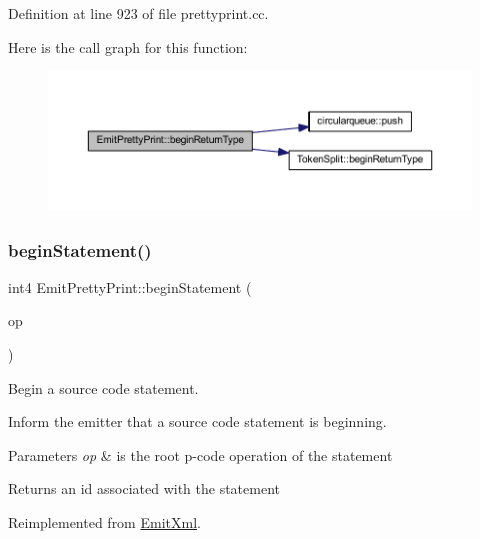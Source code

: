 Definition at line 923 of file prettyprint.\+cc.

Here is the call graph for this function\+:
\nopagebreak
\begin{figure}[H]
\begin{center}
\leavevmode
\includegraphics[width=350pt]{class_emit_pretty_print_a0318a1f41c45d521b22ca097a4a29793_cgraph}
\end{center}
\end{figure}
\mbox{\label{class_emit_pretty_print_a5100568fd6f499acafd9b7f47b700153}} 
\subsubsection{\texorpdfstring{beginStatement()}{beginStatement()}}
{\footnotesize\ttfamily int4 Emit\+Pretty\+Print\+::begin\+Statement (\begin{DoxyParamCaption}\item[{const \mbox{\hyperlink{class_pcode_op}{Pcode\+Op}} $\ast$}]{op }\end{DoxyParamCaption})\hspace{0.3cm}{\ttfamily [virtual]}}



Begin a source code statement. 

Inform the emitter that a source code statement is beginning. 
\begin{DoxyParams}{Parameters}
{\em op} & is the root p-\/code operation of the statement \\
\hline
\end{DoxyParams}
\begin{DoxyReturn}{Returns}
an id associated with the statement 
\end{DoxyReturn}


Reimplemented from \mbox{\hyperlink{class_emit_xml_a597d30a7231fa323c2bdef9afc8160aa}{Emit\+Xml}}.



